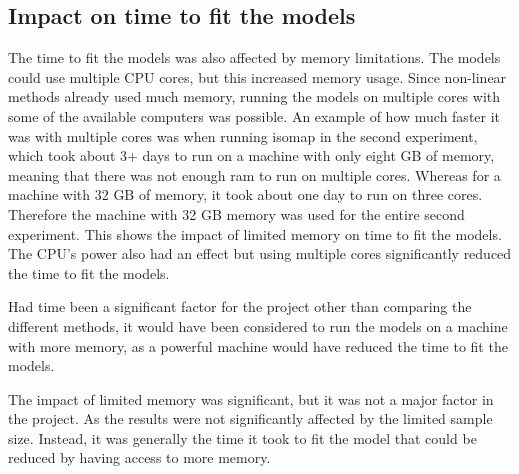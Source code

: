 \subsection{Impact on time to fit the models}\label{subsec:impact_on_time_to_fit_the_models}
The time to fit the models was also affected by memory limitations. The models could use multiple CPU cores, but this increased memory usage. Since non-linear methods already used much memory, running the models on multiple cores with some of the available computers was possible. An example of how much faster it was with multiple cores was when running \gls{isomap} in the second experiment, which took about 3+ days to run on a machine with only eight GB of memory, meaning that there was not enough ram to run on multiple cores. Whereas for a machine with 32 GB of memory, it took about one day to run on three cores. Therefore the machine with 32 GB memory was used for the entire second experiment. This shows the impact of limited memory on time to fit the models. The CPU's power also had an effect but using multiple cores significantly reduced the time to fit the models.

Had time been a significant factor for the project other than comparing the different methods, it would have been considered to run the models on a machine with more memory, as a powerful machine would have reduced the time to fit the models.

The impact of limited memory was significant, but it was not a major factor in the project. As the results were not significantly affected by the limited sample size. Instead, it was generally the time it took to fit the model that could be reduced by having access to more memory.


